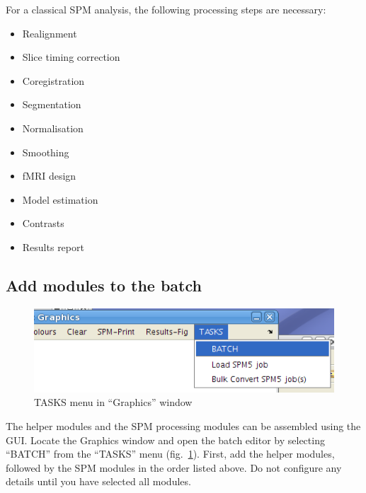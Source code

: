 \documentclass[a4paper]{book}
\begin{document}
For a classical SPM analysis, the following processing steps are necessary:

\begin{itemize}
\item Realignment
\item Slice timing correction
\item Coregistration
\item Segmentation
\item Normalisation
\item Smoothing
\item fMRI design
\item Model estimation
\item Contrasts
\item Results report
\end{itemize}

\subsection{Add modules to the batch}

\begin{figure}[htbp]
  \centering
  \includegraphics{tasks}
  \caption{TASKS menu in ``Graphics'' window}
  \label{fig:tasks}
\end{figure}
The helper modules and the SPM processing modules can be assembled using the
GUI. Locate the Graphics window and open the batch editor by selecting
``BATCH'' from the ``TASKS'' menu (fig.~\ref{fig:tasks}). First, add the
helper modules, followed by the SPM modules in the order listed above. Do not
configure any details until you have selected all modules.
\end{document}
